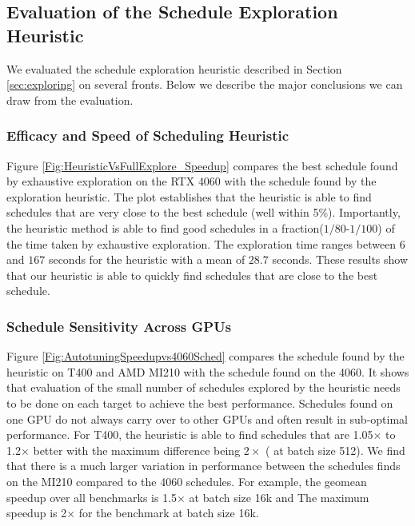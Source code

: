 \subsection{Evaluation of the Schedule Exploration Heuristic}
We evaluated the schedule exploration heuristic described in Section \ref{sec:exploring} on several fronts.
Below we describe the major conclusions we can draw from the evaluation.

\subsubsection*{Efficacy and Speed of Scheduling Heuristic}
Figure \ref{Fig:HeuristicVsFullExplore_Speedup} compares the best schedule found by exhaustive exploration on the RTX 4060 
with the schedule found by the exploration heuristic.
The plot establishes that the 
heuristic is able to find schedules that are very close to the best schedule (well 
within 5\%). 
Importantly, the heuristic method is able to find good schedules in a fraction($1/80$-$1/100$) of the time taken by exhaustive exploration.
The exploration time ranges between $6$ and $167$ seconds for the heuristic with a mean of $28.7$ seconds.
These results show that our heuristic is able to quickly find schedules that are close to the best schedule.

\subsubsection*{Schedule Sensitivity Across GPUs}
Figure \ref{Fig:AutotuningSpeedupvs4060Sched}
compares the schedule found by the heuristic on T400 and AMD MI210 with the schedule found on the 4060.
It shows that evaluation of the small number of schedules explored by the heuristic needs to be 
done on each target to achieve the best performance.
Schedules found on one GPU do not always carry over to other GPUs and often result in sub-optimal performance.
For T400, the heuristic is able to find schedules that are 1.05$\times$ to 1.2$\times$ better 
with the maximum difference being $2\times$ ( at batch size 512).
We find that there is a much larger variation in performance 
between the schedules \Treebeard{} finds on the MI210 compared to the 4060 schedules. For example, 
the geomean speedup over all benchmarks is 1.5$\times$ at batch size 16k and 
The maximum speedup is 2$\times$ for the  benchmark at batch size 16k.

